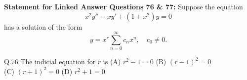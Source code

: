 \documentclass{article}
\begin{document}
																																																																																																																				    \textbf{Statement for Linked Answer Questions 76 \& 77:}  
																																																																																																																				    \vspace{1em} \newline
																																																																																																																				    Suppose the equation  
																																																																																																																				    \[
																																																																																																																				    x^2 y'' - x y' + (1 + x^2) y = 0
																																																																																																																				    \]
																																																																																																																				    has a solution of the form  
																																																																																																																				    \[
																																																																																																																				    y = x^r \sum_{n=0}^{\infty} c_n x^n,\quad c_0 \neq 0.
																																																																																																																				    \]

																																																																																																																				    Q.76 \quad The indicial equation for $r$ is
																																																																																																																				    \vspace{1em} \newline 
																																																																																																																				    (A) $r^2 - 1 = 0$ \hspace{2cm} (B) $(r - 1)^2 = 0$ \hspace{2cm} \\ (C) $(r + 1)^2 = 0$ \hspace{2cm} (D) $r^2 + 1 = 0$
																																																																																																																				    \vspace{1em} \newline
\end{document}
